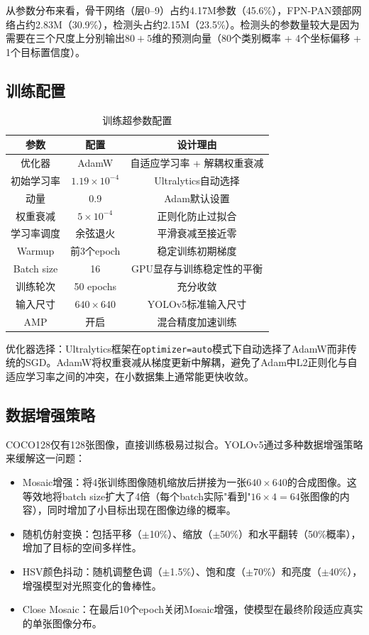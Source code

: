 \documentclass[12pt,a4paper]{article}
\begin{document}
从参数分布来看，骨干网络（层0--9）占约4.17M参数（45.6\%），FPN-PAN颈部网络占约2.83M（30.9\%），检测头占约2.15M（23.5\%）。检测头的参数量较大是因为需要在三个尺度上分别输出$80+5$维的预测向量（80个类别概率 + 4个坐标偏移 + 1个目标置信度）。

\subsection{训练配置}

\begin{table}[H]
\centering
\caption{训练超参数配置}
\label{tab:config}
\begin{tabular}{ccc}
\toprule
\textbf{参数} & \textbf{配置} & \textbf{设计理由} \\
\midrule
优化器 & AdamW & 自适应学习率 + 解耦权重衰减 \\
初始学习率 & $1.19 \times 10^{-4}$ & Ultralytics自动选择 \\
动量 & 0.9 & Adam默认设置 \\
权重衰减 & $5 \times 10^{-4}$ & 正则化防止过拟合 \\
学习率调度 & 余弦退火 & 平滑衰减至接近零 \\
Warmup & 前3个epoch & 稳定训练初期梯度 \\
Batch size & 16 & GPU显存与训练稳定性的平衡 \\
训练轮次 & 50 epochs & 充分收敛 \\
输入尺寸 & $640 \times 640$ & YOLOv5标准输入尺寸 \\
AMP & 开启 & 混合精度加速训练 \\
\bottomrule
\end{tabular}
\end{table}

优化器选择：Ultralytics框架在\texttt{optimizer=auto}模式下自动选择了AdamW而非传统的SGD。AdamW将权重衰减从梯度更新中解耦，避免了Adam中L2正则化与自适应学习率之间的冲突，在小数据集上通常能更快收敛。

\subsection{数据增强策略}

COCO128仅有128张图像，直接训练极易过拟合。YOLOv5通过多种数据增强策略来缓解这一问题：
\begin{itemize}[leftmargin=*]
    \item Mosaic增强：将4张训练图像随机缩放后拼接为一张$640\times640$的合成图像。这等效地将batch size扩大了4倍（每个batch实际"看到"$16\times4=64$张图像的内容），同时增加了小目标出现在图像边缘的概率。
    \item 随机仿射变换：包括平移（$\pm$10\%）、缩放（$\pm$50\%）和水平翻转（50\%概率），增加了目标的空间多样性。
    \item HSV颜色抖动：随机调整色调（$\pm$1.5\%）、饱和度（$\pm$70\%）和亮度（$\pm$40\%），增强模型对光照变化的鲁棒性。
    \item Close Mosaic：在最后10个epoch关闭Mosaic增强，使模型在最终阶段适应真实的单张图像分布。
\end{itemize}
\end{document}
